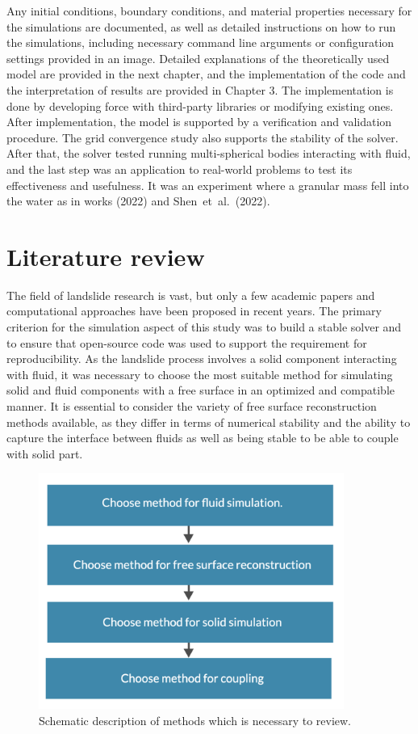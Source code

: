 Any initial conditions, boundary conditions, and material properties necessary for the simulations are documented, as well as detailed instructions on how to run the simulations, including necessary command line arguments or configuration settings provided in an image. Detailed explanations of the theoretically used model are provided in the next chapter, and the implementation of the code and the interpretation of results are provided in Chapter 3. The implementation is done by developing force with third-party libraries or modifying existing ones. After implementation, the model is supported by a verification and validation procedure. The grid convergence study also supports the stability of the solver. After that, the solver tested running multi-spherical bodies interacting with fluid, and the last step was an application to real-world problems to test its effectiveness and usefulness. It was an experiment where a granular mass fell into the water as in works (2022)\cite{mao2020resolved} and Shen~et~al.~(2022)\cite{shen2022resolved}.

\section{Literature review}

The field of landslide research is vast, but only a few academic papers and computational approaches have been proposed in recent years. The primary criterion for the simulation aspect of this study was to build a stable solver and to ensure that open-source code was used to support the requirement for reproducibility. As the landslide process involves a solid component interacting with fluid, it was necessary to choose the most suitable method for simulating solid and fluid components with a free surface in an optimized and compatible manner. It is essential to consider the variety of free surface reconstruction methods available, as they differ in terms of numerical stability and the ability to capture the interface between fluids as well as being stable to be able to couple with solid part. 

\begin{figure}[!ht]
    \centering
    \includegraphics[width=10cm]{GWU_Thesis_Sarmakeeva/Images/chap1/lit_rew.png}
    \caption{Schematic description of methods which is necessary to review.}
    \label{fig:aims}
\end{figure}

